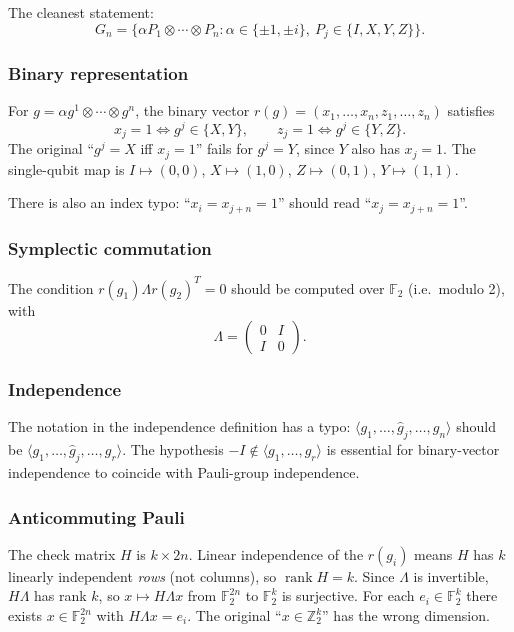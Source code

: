 \documentclass[12pt]{article}
\theoremstyle{plain}
\theoremstyle{definition}
\begin{document}
The cleanest statement:
\[
G_n=\{\alpha P_1\otimes\cdots\otimes P_n:\alpha\in\{\pm 1,\pm i\},\ P_j\in\{I,X,Y,Z\}\}.
\]

\subsubsection*{Binary representation}

For $g=\alpha g^1\otimes\cdots\otimes g^n$, the binary vector $r(g)=(x_1,\ldots,x_n,z_1,\ldots,z_n)$ satisfies
\[
x_j=1\iff g^j\in\{X,Y\},\qquad z_j=1\iff g^j\in\{Y,Z\}.
\]
The original ``$g^j=X$ iff $x_j=1$'' fails for $g^j=Y$, since $Y$ also has $x_j=1$. The single-qubit map is $I\mapsto(0,0)$, $X\mapsto(1,0)$, $Z\mapsto(0,1)$, $Y\mapsto(1,1)$.

There is also an index typo: ``$x_i=x_{j+n}=1$'' should read ``$x_j=x_{j+n}=1$''.

\subsubsection*{Symplectic commutation}

The condition $r(g_1)\Lambda r(g_2)^T=0$ should be computed over $\mathbb{F}_2$ (i.e.\ modulo 2), with
\[
\Lambda=\begin{pmatrix}0 & I\\ I & 0\end{pmatrix}.
\]

\subsubsection*{Independence}

The notation in the independence definition has a typo: $\langle g_1,\ldots,\widehat{g}_j,\ldots,g_n\rangle$ should be $\langle g_1,\ldots,\widehat{g}_j,\ldots,g_r\rangle$. The hypothesis $-I\notin\langle g_1,\ldots,g_r\rangle$ is essential for binary-vector independence to coincide with Pauli-group independence.

\subsubsection*{Anticommuting Pauli}

The check matrix $H$ is $k\times 2n$. Linear independence of the $r(g_i)$ means $H$ has $k$ linearly independent \emph{rows} (not columns), so $\operatorname{rank}H=k$. Since $\Lambda$ is invertible, $H\Lambda$ has rank $k$, so $x\mapsto H\Lambda x$ from $\mathbb{F}_2^{2n}$ to $\mathbb{F}_2^k$ is surjective. For each $e_i\in\mathbb{F}_2^k$ there exists $x\in\mathbb{F}_2^{2n}$ with $H\Lambda x=e_i$. The original ``$x\in\mathbb{Z}_2^k$'' has the wrong dimension.
\end{document}
